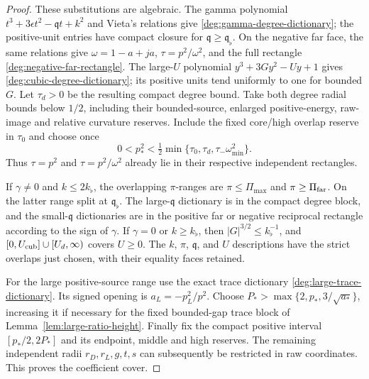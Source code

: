 \begin{proof}
These substitutions are algebraic. The gamma polynomial
\(t^3+3\epsilon t^2-\mathfrak qt+k^2\) and Vieta's relations give
\eqref{deg:gamma-degree-dictionary}; the positive-unit entries have
compact closure for \(\mathfrak q\ge\mathfrak q_\flat\).
On the negative far face, the same relations give
\(\omega=1-a+ja\), \(\tau=p^2/\omega^2\), and the full rectangle
\eqref{deg:negative-far-rectangle}. The large-\(U\) polynomial
\(y^3+3Gy^2-Uy+1\) gives
\eqref{deg:cubic-degree-dictionary}; its positive units tend uniformly
to one for bounded \(G\). Let \(\tau_d>0\) be the resulting compact
degree bound. Take both degree radial bounds below \(1/2\), including
their bounded-source, enlarged positive-energy, raw-image and relative
curvature reserves. Include the fixed core/high overlap reserve in
\(\tau_0\) and choose once
\begin{equation}\label{eq:pure-small-ratio-reserve}
0<p_*^2<\tfrac12\min\{\tau_0,\tau_d,
                              \tau_-\omega_{\min}^2\}.
\end{equation}
Thus \(\tau=p^2\) and \(\tau=p^2/\omega^2\) already lie in their
respective independent rectangles.

If \(\gamma\ne0\) and \(k\le2k_\flat\), the overlapping
\(\pi\)-ranges are \(\pi\le\Pi_{\max}\) and
\(\pi\ge\Pi_{\rm far}\). On the latter range split at
\(\mathfrak q_\flat\). The large-\(\mathfrak q\) dictionary is in
the compact degree block, and the small-\(\mathfrak q\) dictionaries
are in the positive far or negative reciprocal rectangle according to
the sign of \(\gamma\). If \(\gamma=0\) or \(k\ge k_\flat\),
then \(|G|^{3/2}\le k_\flat^{-1}\), and
\([0,U_{\rm cub}]\cup[U_d,\infty)\) covers \(U\ge0\).
The \(k\), \(\pi\), \(\mathfrak q\), and \(U\) descriptions
have the strict overlaps just chosen, with their equality faces retained.

For the large positive-source range use the exact trace dictionary
\eqref{deg:large-trace-dictionary}. Its signed opening is
\(a_L=-p_L^2/p^2\). Choose
\(P_*>\max\{2,p_*,3/\sqrt{a_*}\}\), increasing it if necessary
for the fixed bounded-gap trace block of
Lemma~\ref{lem:large-ratio-height}. Finally fix the compact positive
interval \([p_*/2,2P_*]\) and its endpoint, middle and high reserves.
The remaining independent radii \(r_D,r_L,g,t,s\) can subsequently
be restricted in raw coordinates. This proves the coefficient cover.
\end{proof}



